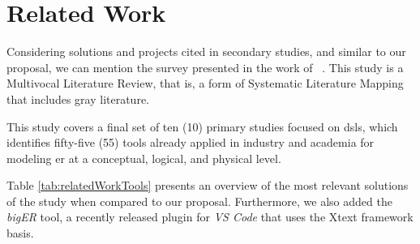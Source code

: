 \section{Related Work} \label{sec_slm:relatedWork}

Considering solutions and projects cited in secondary studies, and similar to our proposal, we can mention the survey presented in the work of ~\cite{eres:2021}.
This study is a Multivocal Literature Review, that is, a form of Systematic Literature Mapping that includes gray literature.

This study covers a final set of ten (10) primary studies focused on \acp{dsl}, which identifies fifty-five (55) tools already applied in industry and academia for modeling \ac{er} at a conceptual, logical, and physical level.

Table \ref{tab:relatedWorkTools}  presents an overview of the most relevant solutions of the study when compared to our proposal.
Furthermore, we also added the \textit{bigER} tool, a recently released plugin for \textit{VS Code} that uses the Xtext framework basis.

